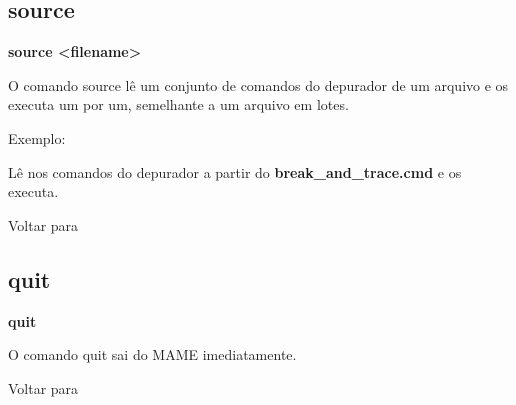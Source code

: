 \documentclass[letterpaper,10pt,brazil]{sphinxmanual}
\begin{document}
\subsection{source}
\label{debugger/general:source}\label{debugger/general:debugger-command-source}
\begin{DUlineblock}{0em}
\item[]
\begin{DUlineblock}{\DUlineblockindent}
\item[] \textbf{source \textless{}filename\textgreater{}}
\item[] 
\end{DUlineblock}
\item[] O comando source lê um conjunto de comandos do depurador de um arquivo e os executa um por um, semelhante a um arquivo em lotes.
\item[] 
\item[] Exemplo:
\item[] 
\item[]
\begin{DUlineblock}{\DUlineblockindent}
\item[] 
\item[] 
\end{DUlineblock}
\item[] Lê nos comandos do depurador a partir do \textbf{break\_and\_trace.cmd} e os executa.
\item[] 
\item[] Voltar para {\hyperref[debugger/general:debugger\string-general\string-list]{}}
\end{DUlineblock}
\begin{quote}
\label{debugger/general:debugger-command-quit}\end{quote}


\subsection{quit}
\label{debugger/general:quit}\label{debugger/general:debugger-command-quit}
\begin{DUlineblock}{0em}
\item[]
\begin{DUlineblock}{\DUlineblockindent}
\item[] \textbf{quit}
\item[] 
\end{DUlineblock}
\item[] O comando quit sai do MAME imediatamente.
\item[] 
\item[] Voltar para {\hyperref[debugger/general:debugger\string-general\string-list]{}}
\end{DUlineblock}
\end{document}
